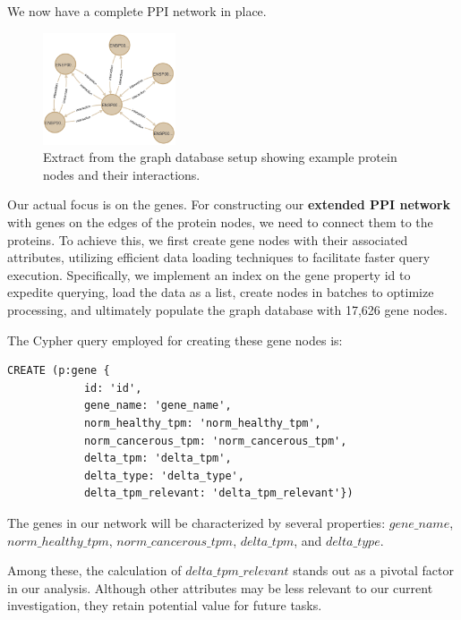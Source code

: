 We now have a complete PPI network in place.\\

\begin{figure}[h]
    \centering
    \includegraphics[width=0.35\textwidth]{figures/03_03_Basic_Network}
    \caption{Extract from the graph database setup showing example protein nodes and their interactions.}
    \label{fig:03_03_Basic_Network}
\end{figure}



Our actual focus is on the genes.
For constructing our \textbf{extended PPI network} with genes on the edges of the protein nodes, we need to connect them to the proteins.
To achieve this, we first create gene nodes with their associated attributes,
utilizing efficient data loading techniques to facilitate faster query execution.
Specifically, we implement an index on the gene property id to expedite querying,
load the data as a list, create nodes in batches to optimize processing,
and ultimately populate the graph database with 17,626 gene nodes.

The Cypher query employed for creating these gene nodes is:
\begin{lstlisting}[language=Cypher, label={lst:gene_nodes}]
    CREATE (p:gene {
            id: 'id',
            gene_name: 'gene_name',
            norm_healthy_tpm: 'norm_healthy_tpm',
            norm_cancerous_tpm: 'norm_cancerous_tpm',
            delta_tpm: 'delta_tpm',
            delta_type: 'delta_type',
            delta_tpm_relevant: 'delta_tpm_relevant'})
\end{lstlisting}

The genes in our network will be characterized by several properties:
$gene\_name$, $norm\_healthy\_tpm$, $norm\_cancerous\_tpm$, $delta\_tpm$, and $delta\_type$.


Among these, the calculation of $delta\_tpm\_relevant$ stands out as a pivotal factor in our analysis.
Although other attributes may be less relevant to our current investigation, they retain potential value for future tasks.

